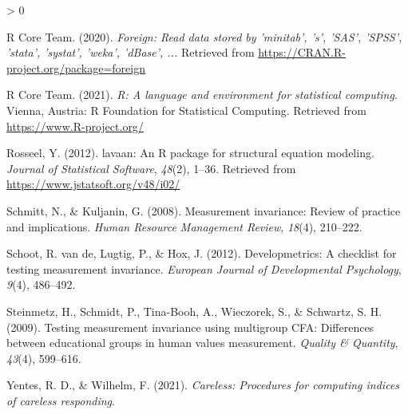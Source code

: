 \documentclass[
  english,
  man]{apa6}
\newlength{\cslhangindent}
\newenvironment{CSLReferences}[2] %
 {%
  \setlength{\parindent}{0pt}
  \ifodd #1 \everypar{\setlength{\hangindent}{\cslhangindent}}\ignorespaces\fi
  \ifnum #2 > 0
  \setlength{\parskip}{#2\baselineskip}
  \fi
 }%
 {}
\begin{document}
\begin{CSLReferences}{1}{0}
\leavevmode\hypertarget{ref-R-foreign}{}%
R Core Team. (2020). \emph{Foreign: Read data stored by 'minitab', 's', 'SAS', 'SPSS', 'stata', 'systat', 'weka', 'dBase', ...} Retrieved from \url{https://CRAN.R-project.org/package=foreign}

\leavevmode\hypertarget{ref-R-base}{}%
R Core Team. (2021). \emph{R: A language and environment for statistical computing}. Vienna, Austria: R Foundation for Statistical Computing. Retrieved from \url{https://www.R-project.org/}

\leavevmode\hypertarget{ref-R-lavaan}{}%
Rosseel, Y. (2012). {lavaan}: An {R} package for structural equation modeling. \emph{Journal of Statistical Software}, \emph{48}(2), 1--36. Retrieved from \url{https://www.jstatsoft.org/v48/i02/}

\leavevmode\hypertarget{ref-schmitt2008measurement}{}%
Schmitt, N., \& Kuljanin, G. (2008). Measurement invariance: Review of practice and implications. \emph{Human Resource Management Review}, \emph{18}(4), 210--222.

\leavevmode\hypertarget{ref-vandevelopmetrics}{}%
Schoot, R. van de, Lugtig, P., \& Hox, J. (2012). Developmetrics: A checklist for testing measurement invariance. \emph{European Journal of Developmental Psychology}, \emph{9}(4), 486--492.

\leavevmode\hypertarget{ref-steinmetz2009testing}{}%
Steinmetz, H., Schmidt, P., Tina-Booh, A., Wieczorek, S., \& Schwartz, S. H. (2009). Testing measurement invariance using multigroup CFA: Differences between educational groups in human values measurement. \emph{Quality \& Quantity}, \emph{43}(4), 599--616.

\leavevmode\hypertarget{ref-R-careless}{}%
Yentes, R. D., \& Wilhelm, F. (2021). \emph{Careless: Procedures for computing indices of careless responding}.

\end{CSLReferences}

\endgroup
\end{document}
